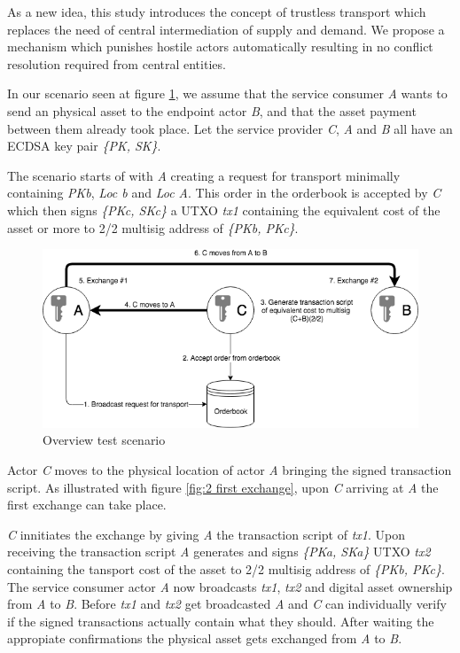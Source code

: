 As a new idea, this study introduces the concept of trustless transport which replaces the need of central intermediation of supply and demand. We propose a mechanism which punishes hostile actors automatically resulting in no conflict resolution required from central entities. \par
In our scenario seen at figure \ref{fig:1 main overview}, we assume that the service consumer \textit{A} wants to send an physical asset to the endpoint actor \textit{B}, and that the asset payment between them already took place. Let the service provider \textit{C}, \textit{A} and \textit{B} all have an ECDSA key pair \textit{\{PK, SK\}}. \par
The scenario starts of with \textit{A} creating a request for transport minimally containing {\textit{PKb}}, \textit{Loc b} and \textit{Loc A}. This order in the orderbook is accepted by \textit{C} which then signs \textit{\{PKc, SKc\}} a UTXO \textit{tx1} containing the equivalent cost of the asset or more to 2/2 multisig address of \textit{\{PKb, PKc\}}. \par

\begin{figure}[h]
\centering
\includegraphics[width=1\textwidth]{images/main.png}
\caption{Overview test scenario}
\label{fig:1 main overview}
\end{figure}

Actor \textit{C} moves to the physical location of actor \textit{A} bringing the signed transaction script. As illustrated with figure \ref{fig:2 first exchange}, upon \textit{C} arriving at \textit{A} the first exchange can take place. \par
\textit{C} innitiates the exchange by giving \textit{A} the transaction script of \textit{tx1}. Upon receiving the transaction script \textit{A} generates and signs \textit{\{PKa, SKa\}} UTXO \textit{tx2} containing the tansport cost of the asset to 2/2 multisig address of \textit{\{PKb, PKc\}}. The service consumer actor \textit{A} now broadcasts \textit{tx1}, \textit{tx2} and digital asset ownership from \textit{A} to \textit{B}. Before \textit{tx1} and \textit{tx2} get broadcasted \textit{A} and \textit{C} can individually verify if the signed transactions actually contain what they should. After waiting the appropiate confirmations the physical asset gets exchanged from \textit{A} to \textit{B}.

